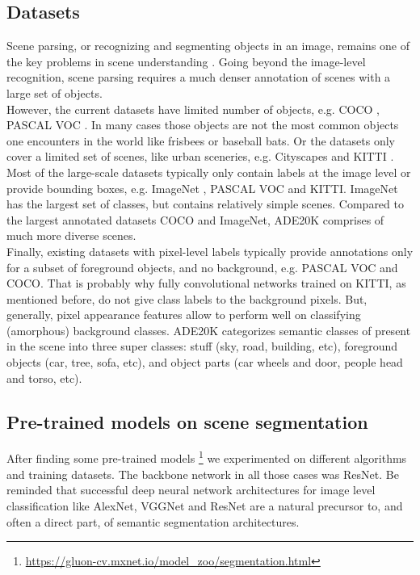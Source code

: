 \documentclass[12pt,a4paper,table,dvipsnames,tikz]{report}
\newcommand{\acronym}{\MakeUppercase}
\begin{document}
	
	\subsection{Datasets}
	\label{sec:fg:nn:sets}
	
	Scene parsing, or recognizing and segmenting objects in an image, remains one 
	of the key problems in scene understanding \citep{Zhou_sem}. Going beyond the image-level 
	recognition, scene parsing requires a much denser annotation of scenes with a large set 
	of objects. 
	\\
	
	However, the current datasets have limited number of objects, e.g. \acronym{coco} 
	\citep{coco}, \acronym{pascal voc} \citep{pascal}. In many cases those objects are not 
	the most common objects one encounters in the world like frisbees or baseball bats. 
	Or the datasets only cover a limited set of scenes, like urban sceneries, e.g. Cityscapes 
	\citep{cityscapes} and \acronym{kitti} \citep{kitti}. Most of the large-scale datasets 
	typically only contain labels at the image level or provide bounding boxes, e.g. ImageNet 
	\citep{Deng}, \acronym{pascal voc} and \acronym{kitti}. ImageNet has the largest set of 
	classes, but contains relatively simple scenes. Compared to the largest annotated datasets 
	\acronym{coco} and ImageNet, \acronym{ade20k} \citep{Zhou_pars} comprises of much more 
	diverse scenes. 
	\\
	
	Finally, existing datasets with pixel-level labels typically provide annotations only 
	for a subset of foreground objects, and no background, e.g. \acronym{pascal voc} and 
	\acronym{coco}. That is probably why fully convolutional networks trained on \acronym{kitti}, 
	as mentioned before, do not give class labels to the background pixels. But, generally, 
	pixel appearance features allow to perform well on classifying (amorphous) background 
	classes. \acronym{ade20k} categorizes semantic classes of present in the scene into three 
	super classes: stuff (sky, 
	road, building, etc), foreground objects (car, tree, sofa, etc), and object parts (car 
	wheels and door, people head and torso, etc).
	\\
	
	
	\subsection{Pre-trained models on scene segmentation}
	\label{sec:fg:nn:pre}
	
	After finding some pre-trained models \footnote{ \url{https://gluon-cv.mxnet.io/model_zoo/segmentation.html}}
	we experimented on different algorithms and training datasets. The backbone network in 
	all those cases was ResNet. Be reminded that successful deep neural network architectures 
	for image level classification like AlexNet, VGGNet and ResNet are a natural precursor 
	to, and often a direct part, of semantic segmentation architectures. 
	\\
	
\end{document}

